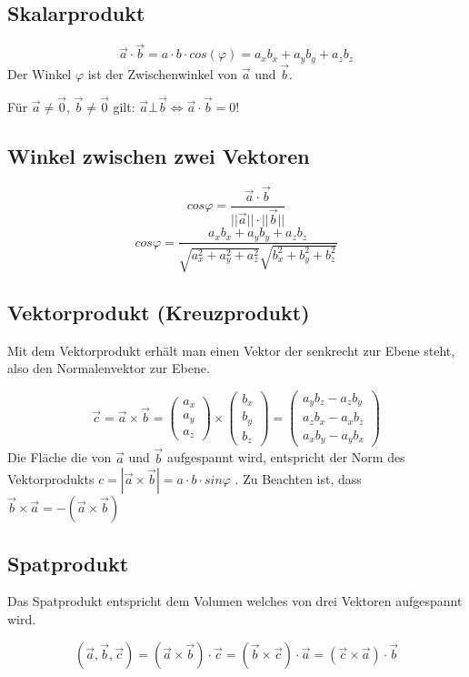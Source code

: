\subsection{Skalarprodukt}
\[ \boxed{ \vec{a} \cdot \vec{b} = a \cdot b \cdot cos(\varphi) = a_x b_x + a_y b_y + a_z b_z } \]
Der Winkel $\varphi$ ist der Zwischenwinkel von $\vec{a}$ und $\vec{b}$.

\noindent
Für $\vec{a} \neq \vec{0}$, $\vec{b} \neq \vec{0}$ gilt: $\vec{a} \bot \vec{b} \Leftrightarrow \vec{a} \cdot \vec{b} = 0$!

\subsection{Winkel zwischen zwei Vektoren}
\[ \boxed{ cos \varphi = \frac{\vec{a} \cdot \vec{b} }{||\vec{a}|| \cdot ||\vec{b}||} } \]
\[ \boxed{ cos \varphi = \frac{a_x b_x + a_y b_y + a_z b_z}{ \sqrt{a_x^2 + a_y^2 + a_z^2} \sqrt{b_x^2 + b_y^2 + b_z^2} } } \]

\subsection{Vektorprodukt (Kreuzprodukt)}
Mit dem Vektorprodukt erhält man einen Vektor der senkrecht zur Ebene steht, also den Normalenvektor zur Ebene.

\[ \boxed{ \vec{c} = \vec{a} \times \vec{b} = 
\left( 
	  \begin{array}{ccc} 
	    a_x \\ a_y \\ a_z
	  \end{array}
	\right)
	\times
	\left( 
	  \begin{array}{ccc} 
	    b_x \\ b_y \\ b_z
	  \end{array}
	\right)
	=
	\left( 
	  \begin{array}{ccc} 
	    a_y b_z - a_z b_y \\ a_z b_x - a_x b_z \\ a_x b_y - a_y b_x
	  \end{array}
	\right)
} \]
\noindent
Die Fläche die von $\vec{a}$ und $\vec{b}$ aufgespannt wird, entspricht der Norm des Vektorprodukts $c=|\vec{a}\times\vec{b}| = a \cdot b \cdot sin \varphi$ .
Zu Beachten ist, dass $\vec{b} \times \vec{a} = -(\vec{a} \times \vec{b}) $

\subsection{Spatprodukt}
Das Spatprodukt entspricht dem Volumen welches von drei Vektoren aufgespannt wird.

\[ \boxed{ (\vec{a},\vec{b},\vec{c}) = (\vec{a} \times \vec{b}) \cdot \vec{c} = (\vec{b} \times \vec{c}) \cdot \vec{a} = (\vec{c} \times \vec{a}) \cdot \vec{b} } \]
